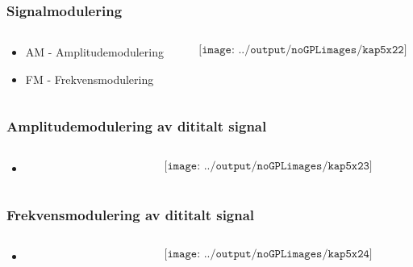 \documentclass[aspectratio=169,xcolor=dvipsnames]{beamer}
\begin{document}
\begin{frame}
	\frametitle{Signalmodulering}
	\begin{columns}
		\begin{column}{0.5\textwidth}

			\begin{itemize}
				\item AM - Amplitudemodulering
				\item FM - Frekvensmodulering
			\end{itemize}

			
		\end{column}

		\begin{column}{0.5\textwidth}
	$$\texttt{[image: ../output/noGPLimages/kap5x22]}$$
		\end{column}
	\end{columns}
\end{frame}
\begin{frame}
	\frametitle{Amplitudemodulering av dititalt signal}
	\begin{columns}
		\begin{column}{0.5\textwidth}

			\begin{itemize}
				\item      
			\end{itemize}

			
		\end{column}

		\begin{column}{0.5\textwidth}
	$$\texttt{[image: ../output/noGPLimages/kap5x23]}$$
		\end{column}
	\end{columns}
\end{frame}
\begin{frame}
	\frametitle{Frekvensmodulering av dititalt signal}
	\begin{columns}
		\begin{column}{0.5\textwidth}

			\begin{itemize}
				\item      
			\end{itemize}

			
		\end{column}

		\begin{column}{0.5\textwidth}
	$$\texttt{[image: ../output/noGPLimages/kap5x24]}$$
		\end{column}
	\end{columns}
\end{frame}
\end{document}
